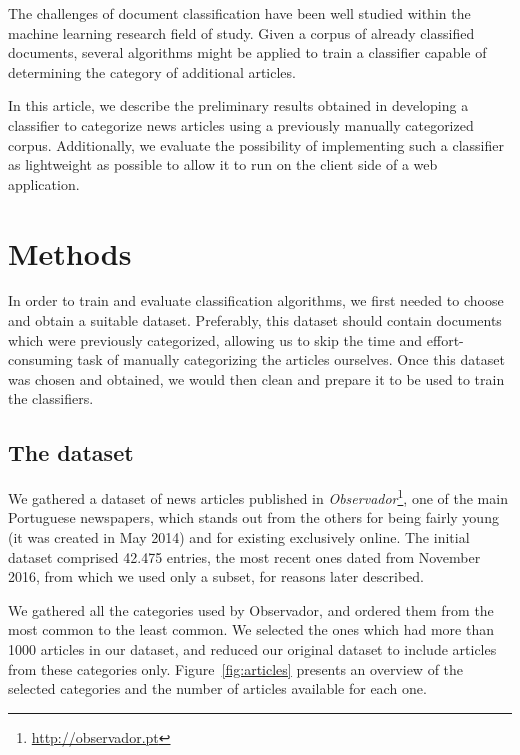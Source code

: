 \documentclass[runningheads,a4paper]{llncs}[2015/06/24]
\begin{document}
The challenges of document classification have been well studied
within the machine learning research field of
study\cite{borko1963automatic,sebastiani2002machine,rubin2012statistical}.
Given a corpus of already classified documents, several algorithms
might be applied to train a classifier capable of determining the
category of additional articles.

In this article, we describe the preliminary results obtained in
developing a classifier to categorize news articles using a previously
manually categorized corpus. Additionally, we evaluate the possibility
of implementing such a classifier as lightweight as possible to allow
it to run on the client side of a web application.

\section{Methods}
In order to train and evaluate classification algorithms, we first
needed to choose and obtain a suitable dataset. Preferably, this
dataset should contain documents which were previously categorized,
allowing us to skip the time and effort-consuming task of
manually categorizing the articles ourselves. Once this dataset was
chosen and obtained, we would then clean and prepare it to be used to
train the classifiers.

\subsection{The dataset}
We gathered a dataset of news articles published in
\textit{Observador}\footnote{\url{http://observador.pt}}, one of the
main Portuguese newspapers, which stands out from the others for being
fairly young (it was created in May 2014) and for existing exclusively
online. The initial dataset comprised 42.475 entries, the most recent
ones dated from November 2016, from which we used only a subset, for
reasons later described.

We gathered all the categories used by Observador, and ordered them
from the most common to the least common. We selected the ones which
had more than 1000 articles in our dataset, and reduced our original
dataset to include articles from these categories only.
Figure~\ref{fig:articles} presents an overview of the selected
categories and the number of articles available for each one.
\end{document}
